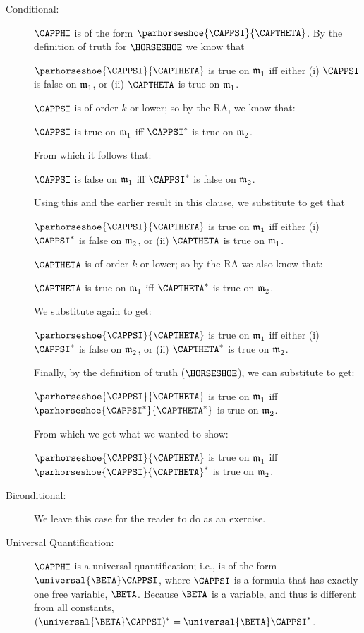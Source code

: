 \begin{PROOF}
\begin{description}
\begin{description}
\item[Conditional:] $\CAPPHI$ is of the form $\parhorseshoe{\CAPPSI}{\CAPTHETA}$. By the definition of truth for $\HORSESHOE$ we know that
\begin{center}
$\parhorseshoe{\CAPPSI}{\CAPTHETA}$ is true on $\mathfrak{m^{\mathrm{}}_{\mathrm{1}}}$
  iff  either
   (i) $\CAPPSI$ is false on $\mathfrak{m^{\mathrm{}}_{\mathrm{1}}}$, or (ii)
   $\CAPTHETA$ is true on $\mathfrak{m^{\mathrm{}}_{\mathrm{1}}}$.
\end{center}
$\CAPPSI$ is of order $k$ or lower; so by the RA, we know that:
\begin{center}
$\CAPPSI$ is true on $\mathfrak{m^{\mathrm{}}_{\mathrm{1}}}$ iff $\CAPPSI^*$ is true on $\mathfrak{m^{\mathrm{}}_{\mathrm{2}}}$.
\end{center}
From which it follows that:
\begin{center}
$\CAPPSI$ is false on $\mathfrak{m^{\mathrm{}}_{\mathrm{1}}}$ iff $\CAPPSI^*$ is false on $\mathfrak{m^{\mathrm{}}_{\mathrm{2}}}$.
\end{center}
Using this and the earlier result in this clause, we substitute to get that
\begin{center}
$\parhorseshoe{\CAPPSI}{\CAPTHETA}$ is true on $\mathfrak{m^{\mathrm{}}_{\mathrm{1}}}$
  iff  either  
	  (i) $\CAPPSI^*$ is false on $\mathfrak{m^{\mathrm{}}_{\mathrm{2}}}$,
        or (ii) $\CAPTHETA$ is true on $\mathfrak{m^{\mathrm{}}_{\mathrm{1}}}$.
\end{center}
$\CAPTHETA$ is of order $k$ or lower; so by the RA we also know that:
\begin{center}
$\CAPTHETA$ is true on $\mathfrak{m^{\mathrm{}}_{\mathrm{1}}}$ iff $\CAPTHETA^*$ is true on $\mathfrak{m^{\mathrm{}}_{\mathrm{2}}}$.
\end{center}
We substitute again to get:
\begin{center}
$\parhorseshoe{\CAPPSI}{\CAPTHETA}$ is true on $\mathfrak{m^{\mathrm{}}_{\mathrm{1}}}$
 iff either 
  (i) $\CAPPSI^*$ is false on $\mathfrak{m^{\mathrm{}}_{\mathrm{2}}}$,
 or (ii) $\CAPTHETA^*$ is true on $\mathfrak{m^{\mathrm{}}_{\mathrm{2}}}$.
\end{center}
Finally, by the definition of truth ($\HORSESHOE$), we can substitute to get:
\begin{center}
$\parhorseshoe{\CAPPSI}{\CAPTHETA}$ is true on $\mathfrak{m^{\mathrm{}}_{\mathrm{1}}}$
 iff $\parhorseshoe{\CAPPSI^*}{\CAPTHETA^*}$ is true on $\mathfrak{m^{\mathrm{}}_{\mathrm{2}}}$.
\end{center}
From which we get what we wanted to show:
\begin{center}
$\parhorseshoe{\CAPPSI}{\CAPTHETA}$ is true on $\mathfrak{m^{\mathrm{}}_{\mathrm{1}}}$ iff  $\parhorseshoe{\CAPPSI}{\CAPTHETA}^*$ is true on $\mathfrak{m^{\mathrm{}}_{\mathrm{2}}}$.
\end{center}

\item[Biconditional:] We leave this case for the reader to do as an exercise.

\item[Universal Quantification:] $\CAPPHI$ is a universal quantification; i.e., is of the form $\universal{\BETA}\CAPPSI$, where $\CAPPSI$ is a formula that has exactly one free variable, $\BETA$.  Because $\BETA$ is a variable, and thus is different from all constants, $(\universal{\BETA}\CAPPSI)^*=\universal{\BETA}\CAPPSI^*$.


\end{description}
\end{description}
\end{PROOF}
